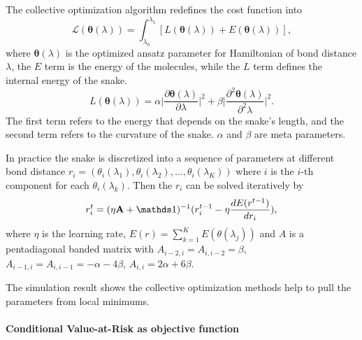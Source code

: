 The collective optimization algorithm redefines the cost function into 
\begin{equation}
\mathcal{L(\boldsymbol{\theta}(\lambda))} = \int_{\lambda_0}^{\lambda_1} [L(\boldsymbol{\theta}(\lambda))+E(\boldsymbol{\theta}(\lambda))], 
\end{equation}
where $\boldsymbol{\theta}(\lambda)$ is the optimized ansatz parameter for Hamiltonian of bond distance $\lambda$, the $E$ term is the energy of the molecules, while the $L$ term defines the internal energy of the snake.
\begin{equation}
    L(\boldsymbol{\theta}(\lambda)) = \alpha \lvert\frac{\partial\boldsymbol{\theta}(\lambda)}{\partial\lambda}\rvert^2 + \beta \lvert\frac{\partial^2\boldsymbol{\theta}(\lambda)}{\partial^2\lambda}\rvert^2.
\end{equation}
The first term refers to the energy that depends on the snake's length, and the second term refers to the curvature of the snake. $\alpha$ and $\beta$ are meta parameters. 

In practice the snake is discretized into a sequence of parameters at different bond distance $r_i = (\theta_i(\lambda_1),\theta_i(\lambda_2),\dots,\theta_i(\lambda_K))$ where $i$ is the $i$-th component for each $\theta_i(\lambda_k)$. Then the $r_i$ can be solved iteratively by
\begin{equation}
    r_i^t=(\eta\mathbf{A}+\unit)^{-1}(r_i^{t-1}-\eta\frac{dE(r^{t-1})}{dr_i}),
\end{equation}
where $\eta$ is the learning rate, $E(r)=\sum_{k=1}^K E(\theta(\lambda_j))$ and $A$ is a pentadiagonal banded matrix with $A_{i-2,i}=A_{i,i-2}=\beta$, $A_{i-1,i}=A_{i,i-1}=-\alpha-4\beta$, $A_{i,i}=2\alpha+6\beta$.

The simulation result shows the collective optimization methods help to pull the parameters from local minimums.

\paragraph{Conditional Value-at-Risk as objective function}

